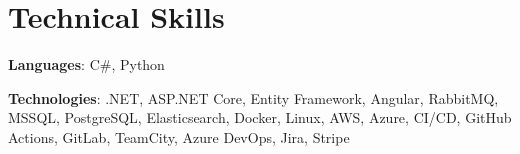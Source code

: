 \documentclass[letterpaper,11pt]{article}
\begin{document}

%
\section{Technical Skills}
\resumeSubHeadingListStart
\item{
            \textbf{Languages}{: C\#, Python}
      }
\item{
            \textbf{Technologies}{: .NET, ASP.NET Core, Entity Framework, Angular, RabbitMQ, MSSQL, PostgreSQL, Elasticsearch, Docker, Linux, AWS, Azure, CI/CD, GitHub Actions, GitLab, TeamCity, Azure DevOps, Jira, Stripe}
      }
\resumeSubHeadingListEnd


\end{document}
